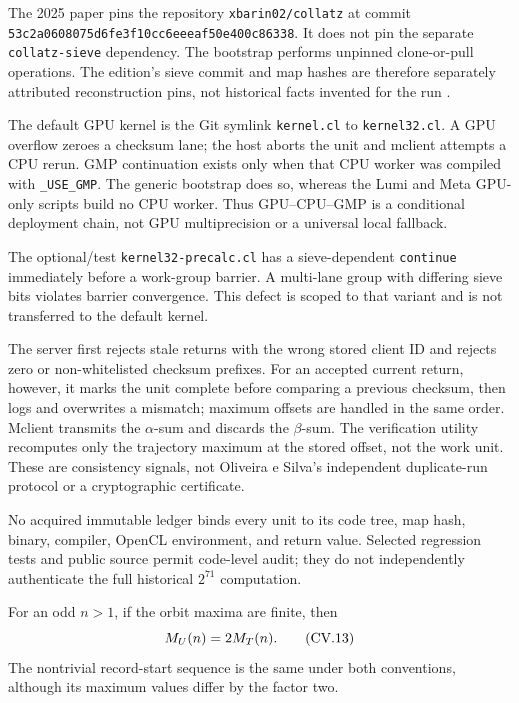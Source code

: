 \begin{sourceissue}
\label{sourceissue:Barina-public-code-validation}
The 2025 paper pins the repository \nolinkurl{xbarin02/collatz} at commit
\linebreak[3]\nolinkurl{53c2a0608075d6fe3f10cc6eeeaf50e400c86338}.
It does not pin the
separate \texttt{collatz-sieve} dependency.  The bootstrap performs unpinned
clone-or-pull operations.  The edition's sieve commit and map hashes are
therefore separately attributed reconstruction pins, not historical facts
invented for the run \cite{BarinaCode2025}.

The default GPU kernel is the Git symlink \texttt{kernel.cl} to
\texttt{kernel32.cl}.  A GPU overflow zeroes a checksum lane; the host aborts
the unit and mclient attempts a CPU rerun.  GMP continuation exists only when
that CPU worker was compiled with \texttt{\_USE\_GMP}.  The generic bootstrap
does so, whereas the Lumi and Meta GPU-only scripts build no CPU worker.
Thus GPU--CPU--GMP is a conditional deployment chain, not GPU
multiprecision or a universal local fallback.

The optional/test \texttt{kernel32-precalc.cl} has a sieve-dependent
\texttt{continue} immediately before a work-group barrier.  A multi-lane
group with differing sieve bits violates barrier convergence.  This defect
is scoped to that variant and is not transferred to the default kernel.

The server first rejects stale returns with the wrong stored client ID and
rejects zero or non-whitelisted checksum prefixes.  For an accepted current
return, however, it marks the unit complete before comparing a previous
checksum, then logs and overwrites a mismatch; maximum offsets are handled in
the same order.  Mclient transmits the $\alpha$-sum and discards the
$\beta$-sum.  The verification utility recomputes only the trajectory maximum
at the stored offset, not the work unit.  These are consistency signals, not
Oliveira e Silva's independent duplicate-run protocol or a cryptographic
certificate.

No acquired immutable ledger binds every unit to its code tree, map hash,
binary, compiler, OpenCL environment, and return value.  Selected regression
tests and public source permit code-level audit; they do not independently
authenticate the full historical $2^{71}$ computation.
\end{sourceissue}

\begin{proposition}
\label{prop:shortened-unshortened-maxima}
For an odd $n>1$, if the orbit maxima are finite, then
\begin{equation}
\stepcounter{equation}
\label{eq:shortened-unshortened-maxima}
 M_U(n)=2M_T(n).
\tag{CV.13}
\end{equation}
The nontrivial record-start sequence is the same under both conventions,
although its maximum values differ by the factor two.
\end{proposition}

